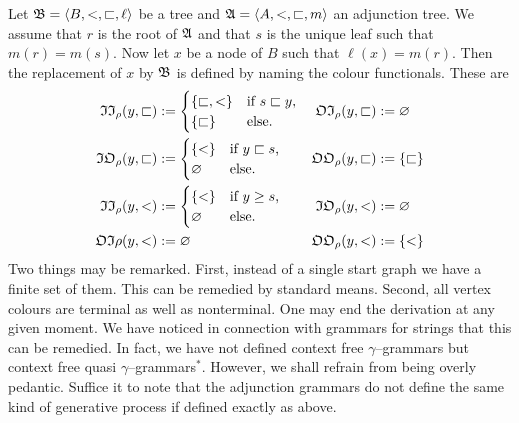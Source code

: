 Let $\mathfrak{B} = \langle B, <, \sqsubset, \ell\rangle$ be a tree and
$\mathfrak{A} = \langle A, <, \sqsubset, m \rangle$ an adjunction tree.
We assume that $r$ is the root of $\mathfrak{A}$ and that $s$ is
the unique leaf such that $m(r) = m(s)$. Now let $x$ be a node
of $B$ such that $\ell(x) = m(r)$. Then the replacement
of $x$ by $\mathfrak{B}$ is defined by naming the colour functionals.
These are
\begin{align}
\mathfrak{II}_{\rho}(y,\sqsubset) & :=
    \begin{cases}
        \{\sqsubset, <\} & \text{if $s \sqsubset y$,} \\
                \{\sqsubset\} & \text{else.}
    \end{cases}
     &
\mathfrak{OI}_{\rho}(y, \sqsubset) & := \varnothing \\\notag
\mathfrak{IO}_{\rho}(y, \sqsubset) & := 
    \begin{cases}
    \{<\} & \text{if $y \sqsubset s$,} \\
    \varnothing & \text{else.}
    \end{cases} &
\mathfrak{OO}_{\rho}(y,\sqsubset) & := \{\sqsubset\} \\
\mathfrak{II}_{\rho}(y, <)         & := 
	\begin{cases} 
		\{<\} & \text{if $y \geq s$,} \\
		\varnothing & \text{else.} 
	\end{cases}
	&
    \mathfrak{IO}_{\rho}(y, <) & := \varnothing \\\notag
\mathfrak{OI}{\rho}(y, <) & := \varnothing &
    \mathfrak{OO}_{\rho}(y,<) & := \{<\}
\end{align}
Two things may be remarked.  First, instead of a single
start graph we have a finite set of them. This can be
remedied by standard means. Second, all vertex colours
are terminal as well as nonterminal. One may end the
derivation at any given moment. We have noticed in
connection with grammars  for strings that this can be
remedied. In fact, we have not defined context free 
$\gamma$--grammars but context free quasi 
$\gamma$--grammars$^{\ast}$. However, we shall refrain
from being overly pedantic. Suffice it to note that the
adjunction grammars do not define the same kind of
generative process if defined exactly as above.

